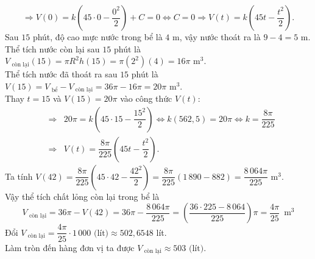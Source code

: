 \begin{bt}
{		 \[\Rightarrow V(0)=k\left(45\cdot 0-\dfrac{0^2}{2}\right)+C=0\Leftrightarrow C=0\Rightarrow V(t)=k\left(45t-\dfrac{t^2}{2}\right).\]
		Sau  $15$ phút, độ cao mực nước trong bể là $4$ m, vậy nước thoát ra là $9-4=5$ m.\\
		Thể tích nước còn lại sau $15$  phút là $V_{\text{ còn lại}}(15)=\pi R^2h(15)=\pi (2^2)(4)=16\pi$ m$^3$.\\
		Thể tích nước đã thoát ra sau $15$ phút là $V(15)=V_{\text{  bể}}-V_{\text{ còn lại}}=36\pi-16\pi=20\pi$ m$^3$.\\
		Thay $t=15$  và $V(15)=20\pi$ vào công thức $V(t)$:
		 \allowdisplaybreaks
		\begin{eqnarray*}
			&\Rightarrow& 20\pi =  k\left(45\cdot 15-\dfrac{15^2}{2}\right)\Leftrightarrow k\left(562{, }5\right)=20\pi \Leftrightarrow k=\dfrac{8\pi}{225} \\
			&\Rightarrow&  V(t)=\dfrac{8\pi}{225}\left(45t-\dfrac{t^2}{2}\right).
		\end{eqnarray*}
		 Ta tính
		 $V(42)=\dfrac{8\pi}{225}\left(45\cdot 42-\dfrac{42^2}{2}\right)=\dfrac{8\pi}{225}\left(1\,890-882\right)=\dfrac{8\,064\pi}{225}$ m$^3$.\\
		Vậy thể tích chất lỏng  còn lại trong bể là
		\[V_{\text{ còn lại}}=36\pi - V(42)=36\pi - \dfrac{8\,064\pi}{225}=\left(\dfrac{36\cdot 225-8\,064}{225}\right)\pi=\dfrac{4\pi}{25} \,\text{ m}^3 \] 
		Đổi $V_{\text{ còn lại}}=\dfrac{4\pi}{25}\cdot 1\,000 \text{ (lít)} \approx 502{,}6548$  lít.\\
		Làm tròn đến hàng đơn vị ta  được $V_{\text{ còn lại}} \approx 503 \text{ (lít)}$.
	} 
\end{bt}

